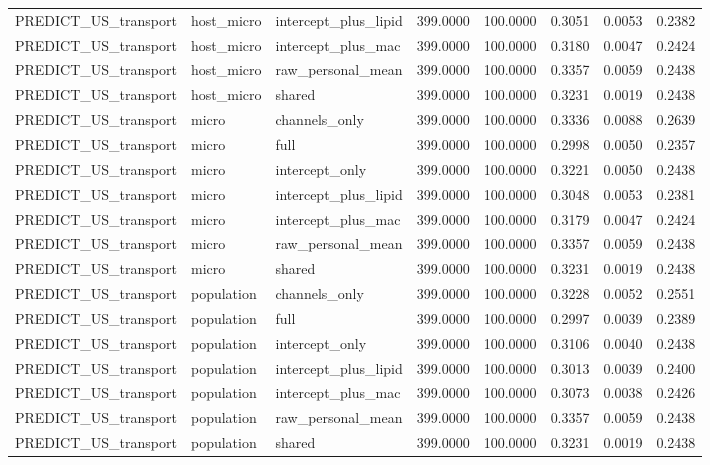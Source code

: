 {\begin{longtable}{llllllll}
PREDICT\_US\_transport & host\_micro & intercept\_plus\_lipid & 399.0000 & 100.0000 & 0.3051 & 0.0053 & 0.2382 \\
PREDICT\_US\_transport & host\_micro & intercept\_plus\_mac & 399.0000 & 100.0000 & 0.3180 & 0.0047 & 0.2424 \\
PREDICT\_US\_transport & host\_micro & raw\_personal\_mean & 399.0000 & 100.0000 & 0.3357 & 0.0059 & 0.2438 \\
PREDICT\_US\_transport & host\_micro & shared & 399.0000 & 100.0000 & 0.3231 & 0.0019 & 0.2438 \\
PREDICT\_US\_transport & micro & channels\_only & 399.0000 & 100.0000 & 0.3336 & 0.0088 & 0.2639 \\
PREDICT\_US\_transport & micro & full & 399.0000 & 100.0000 & 0.2998 & 0.0050 & 0.2357 \\
PREDICT\_US\_transport & micro & intercept\_only & 399.0000 & 100.0000 & 0.3221 & 0.0050 & 0.2438 \\
PREDICT\_US\_transport & micro & intercept\_plus\_lipid & 399.0000 & 100.0000 & 0.3048 & 0.0053 & 0.2381 \\
PREDICT\_US\_transport & micro & intercept\_plus\_mac & 399.0000 & 100.0000 & 0.3179 & 0.0047 & 0.2424 \\
PREDICT\_US\_transport & micro & raw\_personal\_mean & 399.0000 & 100.0000 & 0.3357 & 0.0059 & 0.2438 \\
PREDICT\_US\_transport & micro & shared & 399.0000 & 100.0000 & 0.3231 & 0.0019 & 0.2438 \\
PREDICT\_US\_transport & population & channels\_only & 399.0000 & 100.0000 & 0.3228 & 0.0052 & 0.2551 \\
PREDICT\_US\_transport & population & full & 399.0000 & 100.0000 & 0.2997 & 0.0039 & 0.2389 \\
PREDICT\_US\_transport & population & intercept\_only & 399.0000 & 100.0000 & 0.3106 & 0.0040 & 0.2438 \\
PREDICT\_US\_transport & population & intercept\_plus\_lipid & 399.0000 & 100.0000 & 0.3013 & 0.0039 & 0.2400 \\
PREDICT\_US\_transport & population & intercept\_plus\_mac & 399.0000 & 100.0000 & 0.3073 & 0.0038 & 0.2426 \\
PREDICT\_US\_transport & population & raw\_personal\_mean & 399.0000 & 100.0000 & 0.3357 & 0.0059 & 0.2438 \\
PREDICT\_US\_transport & population & shared & 399.0000 & 100.0000 & 0.3231 & 0.0019 & 0.2438 \\
\bottomrule
\end{longtable}}
